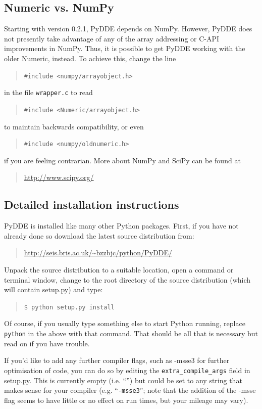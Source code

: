 \documentclass[10pt,a4paper] {article}
\begin{document}
\subsection{Numeric vs. NumPy}

Starting with version 0.2.1, PyDDE depends on NumPy.  However, PyDDE does not presently take advantage of any of the array addressing or C-API improvements in NumPy.  Thus, it is possible to get PyDDE working with the older Numeric, instead.  To achieve this, change the line
\begin{quotation}\verb+#include <numpy/arrayobject.h>+\end{quotation}
in the file \verb+wrapper.c+ to read
\begin{quotation}\verb+#include <Numeric/arrayobject.h>+\end{quotation}
to maintain backwards compatibility, or even
\begin{quotation}\verb+#include <numpy/oldnumeric.h>+\end{quotation}
if you are feeling contrarian.  More about NumPy and SciPy can be found at
\begin{quotation}\url{http://www.scipy.org/}\end{quotation}

\subsection{Detailed installation instructions}

PyDDE is installed like many other Python packages.  First, if you have not 
already done so download the latest source distribution from:
\begin{quotation}\url{http://seis.bris.ac.uk/~bzzbjc/python/PyDDE/}\end{quotation}
Unpack the source distribution to a suitable location, open a command or 
terminal window, change to the root directory of the source distribution (which 
will contain setup.py) and type:
\begin{quotation}\verb+$ python setup.py install+\end{quotation}
Of course, if you usually type something else to start Python running, replace
\verb+python+ in the above with that command.  That should be all that is necessary but read on if you have trouble.  

If you'd like to add any further compiler flags, such as -msse3 for further optimisation of code, you can do so by editing the \verb+extra_compile_args+ field in setup.py.  This is currently empty (i.e. ``'') but could be set to any string that makes sense for your compiler (e.g. ``\verb+-msse3+''; note that the addition of the -msse flag seems to have little or no effect on run times, but your mileage may vary).
\end{document}
